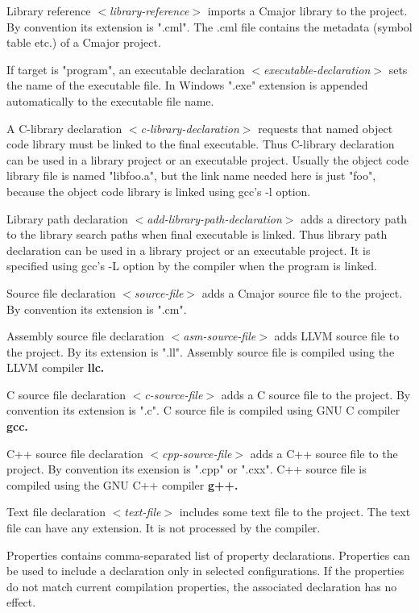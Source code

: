\documentclass[a4paper,oneside,11pt]{article}
\begin{document}
Library reference \emph{$<$library-reference$>$} imports a Cmajor library to the project.
By convention its extension is ".cml".
The .cml file contains the metadata (symbol table etc.) of a Cmajor project.

If target is "program", an executable declaration \emph{$<$executable-declaration$>$}
sets the name of the executable file.
In Windows ".exe" extension is appended automatically to the executable file name.

A C-library declaration \emph{$<$c-library-declaration$>$}
requests that named object code library must be linked to the final executable.
Thus C-library declaration can be used in a library project or an executable project.
Usually the object code library file is named "libfoo.a", but the link name needed here is just "foo",
because the object code library is linked using gcc's -l option.

Library path declaration \emph{$<$add-library-path-declaration$>$}
adds a directory path to the library search paths when final executable is linked.
Thus library path declaration can be used in a library project or an executable project.
It is specified using gcc's -L option by the compiler when the program is linked.

Source file declaration \emph{$<$source-file$>$} adds a Cmajor source file to the project.
By convention its extension is ".cm".

Assembly source file declaration \emph{$<$asm-source-file$>$} adds LLVM source file to the project.
By its extension is ".ll". Assembly source file is compiled using the LLVM compiler \bf{llc}.

C source file declaration \emph{$<$c-source-file$>$} adds a C source file to the project.
By convention its extension is ".c". C source file is compiled using GNU C compiler \bf{gcc}.

C++ source file declaration \emph{$<$cpp-source-file$>$} adds a C++ source file to the project.
By convention its exension is ".cpp" or ".cxx".
C++ source file is compiled using the GNU C++ compiler \bf{g++}.

Text file declaration \emph{$<$text-file$>$} includes some text file to the project.
The text file can have any extension. It is not processed by the compiler.

Properties contains comma-separated list of property declarations.
Properties can be used to include a declaration only in selected configurations.
If the properties do not match current compilation properties, the associated declaration has no effect.
\end{document}
